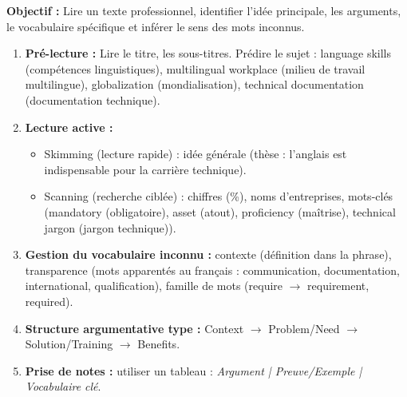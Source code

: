\documentclass[11pt]{article}
\newcommand{\cle}[1]{{\popxbold\color{popdark}#1}}
\begin{document}
\begin{methode}
\textbf{Objectif :} Lire un texte professionnel, identifier l'idée principale, les arguments, le vocabulaire spécifique et inférer le sens des mots inconnus.
\begin{enumerate}
    \item \textbf{Pré-lecture :} Lire le titre, les sous-titres. Prédire le sujet : \cle{language skills} (compétences linguistiques), \cle{multilingual workplace} (milieu de travail multilingue), \cle{globalization} (mondialisation), \cle{technical documentation} (documentation technique).
    \item \textbf{Lecture active :}
    \begin{itemize}
        \item \cle{Skimming} (lecture rapide) : idée générale (thèse : l'anglais est indispensable pour la carrière technique).
        \item \cle{Scanning} (recherche ciblée) : chiffres (\%), noms d'entreprises, mots-clés (\cle{mandatory} (obligatoire), \cle{asset} (atout), \cle{proficiency} (maîtrise), \cle{technical jargon} (jargon technique)).
    \end{itemize}
    \item \textbf{Gestion du vocabulaire inconnu :} contexte (définition dans la phrase), transparence (mots apparentés au français : \cle{communication, documentation, international, qualification}), famille de mots (\cle{require $\rightarrow$ requirement, required}).
    \item \textbf{Structure argumentative type :} \cle{Context} $\rightarrow$ \cle{Problem/Need} $\rightarrow$ \cle{Solution/Training} $\rightarrow$ \cle{Benefits}.
    \item \textbf{Prise de notes :} utiliser un tableau : \emph{Argument | Preuve/Exemple | Vocabulaire clé}.
\end{enumerate}
\end{methode}
\end{document}
